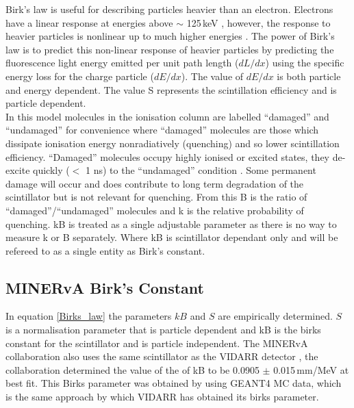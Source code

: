 \documentclass[12pt,a4paper]{article}
\begin{document}
Birk's law is useful for describing particles heavier than an electron. Electrons have a linear response at energies above $\sim$ 125\,keV \cite{birks_book} \cite{craun_and_smith_paper}, however, the response to heavier particles is nonlinear up to much higher energies \cite{craun_and_smith_paper}. The power of Birk's law is to predict this non-linear response of heavier particles by predicting the fluorescence light energy emitted per unit path length ($dL/dx$) using the specific energy loss for the charge particle ($dE/dx$)\cite{craun_and_smith_paper}. The value of $dE/dx$ is both particle and energy dependent. The value S represents the scintillation efficiency and is particle dependent.\\

In this model molecules in the ionisation column are labelled ``damaged'' and ``undamaged'' for convenience where ``damaged'' molecules are those which dissipate ionisation energy nonradiatively (quenching) and so lower scintillation efficiency\cite{craun_and_smith_paper}\cite{rad_det_and_meas}. ``Damaged'' molecules occupy highly ionised or excited states, they de-excite quickly ($<$ 1 ns) to the ``undamaged'' condition \cite{craun_and_smith_paper}. Some permanent damage will occur and does contribute to long term degradation of the scintillator but is not relevant for quenching\cite{craun_and_smith_paper}. From this B is the ratio of ``damaged''/``undamaged'' molecules and k is the relative probability of quenching. kB is treated as a single adjustable parameter as there is no way to measure k or B separately\cite{craun_and_smith_paper}\cite{rad_det_and_meas}. Where kB is scintillator dependant only and will be refereed to as a single entity as Birk's constant. 

\subsection{MINERvA Birk's Constant}
In equation \ref{Birks_law} the parameters $kB$ and $S$ are empirically determined. $S$ is a normalisation parameter that is particle dependent and kB is the birks constant for the scintillator and is particle independent. The MINERvA collaboration \cite{minerva_birks} also uses the same scintillator as the VIDARR detector \cite{Minerva_scint}, the collaboration determined the value of the of kB to be 0.0905 $\pm$ 0.015\,mm/MeV at best fit. This Birks parameter was obtained by using GEANT4 MC data, which is the same approach by which VIDARR has obtained its birks parameter.\\
\end{document}
